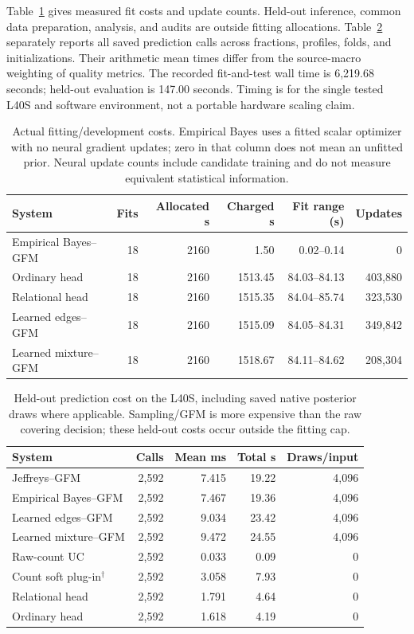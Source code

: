 Table~\ref{tab:posterior-native-training} gives measured fit costs and update counts. Held-out inference, common data preparation, analysis, and audits are outside fitting allocations. Table~\ref{tab:posterior-native-inference} separately reports all saved prediction calls across fractions, profiles, folds, and initializations. Their arithmetic mean times differ from the source-macro weighting of quality metrics. The recorded fit-and-test wall time is 6,219.68 seconds; held-out evaluation is 147.00 seconds. Timing is for the single tested L40S and software environment, not a portable hardware scaling claim.
\begin{table}[ht]\centering\footnotesize
\begin{tabular*}{\linewidth}{@{\extracolsep{\fill}}lrrrrr@{}}\toprule
System & Fits & Allocated s & Charged s & Fit range (s) & Updates\\\midrule
Empirical Bayes--GFM & 18 & 2160 & 1.50 & 0.02--0.14 & 0\\
Ordinary head & 18 & 2160 & 1513.45 & 84.03--84.13 & 403,880\\
Relational head & 18 & 2160 & 1515.35 & 84.04--85.74 & 323,530\\
Learned edges--GFM & 18 & 2160 & 1515.09 & 84.05--84.31 & 349,842\\
Learned mixture--GFM & 18 & 2160 & 1518.67 & 84.11--84.62 & 208,304\\
\bottomrule\end{tabular*}
\caption{Actual fitting/development costs. Empirical Bayes uses a fitted scalar optimizer with no neural gradient updates; zero in that column does not mean an unfitted prior. Neural update counts include candidate training and do not measure equivalent statistical information.}\label{tab:posterior-native-training}\end{table}
\begin{table}[ht]\centering\footnotesize
\begin{tabular*}{\linewidth}{@{\extracolsep{\fill}}lrrrr@{}}\toprule
System & Calls & Mean ms & Total s & Draws/input\\\midrule
Jeffreys--GFM & 2,592 & 7.415 & 19.22 & 4,096\\
Empirical Bayes--GFM & 2,592 & 7.467 & 19.36 & 4,096\\
Learned edges--GFM & 2,592 & 9.034 & 23.42 & 4,096\\
Learned mixture--GFM & 2,592 & 9.472 & 24.55 & 4,096\\
Raw-count UC & 2,592 & 0.033 & 0.09 & 0\\
Count soft plug-in$^{\dagger}$ & 2,592 & 3.058 & 7.93 & 0\\
Relational head & 2,592 & 1.791 & 4.64 & 0\\
Ordinary head & 2,592 & 1.618 & 4.19 & 0\\
\bottomrule\end{tabular*}
\caption{Held-out prediction cost on the L40S, including saved native posterior draws where applicable. Sampling/GFM is more expensive than the raw covering decision; these held-out costs occur outside the fitting cap.}\label{tab:posterior-native-inference}\end{table}

